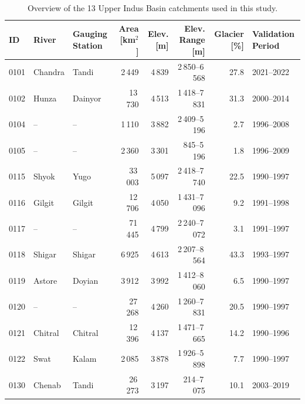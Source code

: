 \begin{table}[ht]
\centering
\caption{Overview of the 13 Upper Indus Basin catchments used in this study.}
\label{tab:catchments}
\begin{tabular}{lllrrrrl}
\toprule
ID & River & Gauging Station & Area [km$^2$] & Elev. [m] & Elev. Range [m] & Glacier [\%] & Validation Period \\
\midrule
0101 & Chandra   & Tandi   &   2\,449 & 4\,839 & 2\,850--6\,568 & 27.8 & 2021--2022 \\
0102 & Hunza     & Dainyor &  13\,730 & 4\,513 & 1\,418--7\,831 & 31.3 & 2000--2014 \\
0104 & --        & --      &   1\,110 & 3\,882 & 2\,409--5\,196 &  2.7 & 1996--2008 \\
0105 & --        & --      &   2\,360 & 3\,301 &    845--5\,196  &  1.8 & 1996--2009 \\
0115 & Shyok     & Yugo    &  33\,003 & 5\,097 & 2\,418--7\,740 & 22.5 & 1990--1997 \\
0116 & Gilgit    & Gilgit  &  12\,706 & 4\,050 & 1\,431--7\,096 &  9.2 & 1991--1998 \\
0117 & --        & --      &  71\,445 & 4\,799 & 2\,240--7\,072 &  3.1 & 1991--1997 \\
0118 & Shigar    & Shigar  &   6\,925 & 4\,613 & 2\,207--8\,564 & 43.3 & 1993--1997 \\
0119 & Astore    & Doyian  &   3\,912 & 3\,992 & 1\,412--8\,060 &  6.5 & 1990--1997 \\
0120 & --        & --      &  27\,268 & 4\,260 & 1\,260--7\,831 & 20.5 & 1990--1997 \\
0121 & Chitral   & Chitral &  12\,396 & 4\,137 & 1\,471--7\,665 & 14.2 & 1990--1996 \\
0122 & Swat      & Kalam   &   2\,085 & 3\,878 & 1\,926--5\,898 &  7.7 & 1990--1997 \\
0130 & Chenab    & Tandi   &  26\,273 & 3\,197 &    214--7\,075  & 10.1 & 2003--2019 \\
\bottomrule
\end{tabular}
\end{table}
